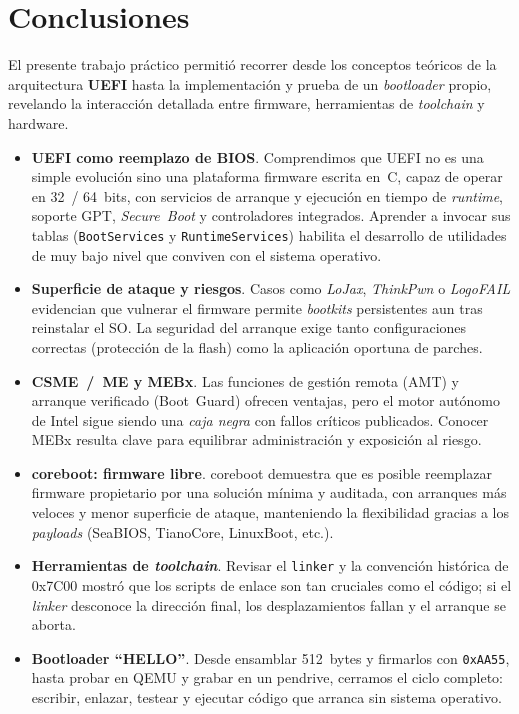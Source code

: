 \section{Conclusiones}

El presente trabajo práctico permitió recorrer desde los conceptos teóricos de la arquitectura \textbf{UEFI} hasta la implementación y prueba de un \emph{bootloader} propio, revelando la interacción detallada entre firmware, herramientas de \emph{toolchain} y hardware.

\begin{itemize}
  \item \textbf{UEFI como reemplazo de BIOS}. Comprendimos que UEFI no es una simple evolución sino una plataforma firmware escrita en~C, capaz de operar en 32~/ 64~bits, con servicios de arranque y ejecución en tiempo de \emph{runtime}, soporte GPT, \emph{Secure Boot} y controladores integrados. Aprender a invocar sus tablas (\texttt{BootServices} y \texttt{RuntimeServices}) habilita el desarrollo de utilidades de muy bajo nivel que conviven con el sistema operativo.
  \item \textbf{Superficie de ataque y riesgos}. Casos como \emph{LoJax}, \emph{ThinkPwn} o \emph{LogoFAIL} evidencian que vulnerar el firmware permite \emph{bootkits} persistentes aun tras reinstalar el SO. La seguridad del arranque exige tanto configuraciones correctas (protección de la flash) como la aplicación oportuna de parches.
  \item \textbf{CSME / ME y MEBx}. Las funciones de gestión remota (AMT) y arranque verificado (Boot Guard) ofrecen ventajas, pero el motor autónomo de Intel sigue siendo una \emph{caja negra} con fallos críticos publicados. Conocer MEBx resulta clave para equilibrar administración y exposición al riesgo.
  \item \textbf{coreboot: firmware libre}. coreboot demuestra que es posible reemplazar firmware propietario por una solución mínima y auditada, con arranques más veloces y menor superficie de ataque, manteniendo la flexibilidad gracias a los \emph{payloads} (SeaBIOS, TianoCore, LinuxBoot, etc.).
  \item \textbf{Herramientas de \emph{toolchain}}. Revisar el \texttt{linker} y la convención histórica de 0x7C00 mostró que los scripts de enlace son tan cruciales como el código; si el \emph{linker} desconoce la dirección final, los desplazamientos fallan y el arranque se aborta.
  \item \textbf{Bootloader ``HELLO''}. Desde ensamblar 512~bytes y firmarlos con \texttt{0xAA55}, hasta probar en QEMU y grabar en un pendrive, cerramos el ciclo completo: escribir, enlazar, testear y ejecutar código que arranca sin sistema operativo.
\end{itemize}

